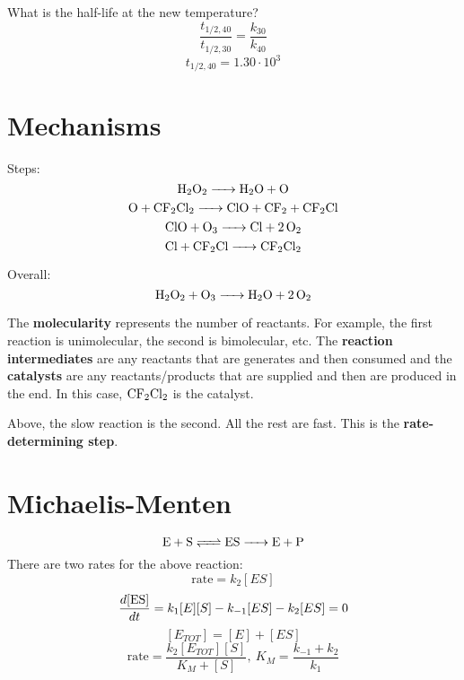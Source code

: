 \documentclass{article}
\begin{document}
What is the half-life at the new temperature?
$$ \frac{ t_{1/2, 40} }{ t_{1/2, 30} } = \frac{k_{30}}{k_{40}} $$
$$ t_{1/2, 40} = 1.30 \cdot 10^{3} $$

\section{Mechanisms}

Steps:
$$ \ce{ H_{2}O_{2} -> H_{2}O + O } $$
$$ \ce{ O + CF_{2}Cl_{2} -> ClO + CF_{2} + CF_{2}Cl } $$
$$ \ce{ ClO + O_{3} -> Cl + 2O_{2} } $$
$$ \ce{ Cl + CF_{2}Cl -> CF_{2}Cl_{2} } $$

Overall:
$$ \ce{ H_{2}O_{2} + O_{3} -> H_{2}O + 2O_{2} } $$

The \textbf{molecularity} represents the number of reactants. For example, the
first reaction is unimolecular, the second is bimolecular, etc. The
\textbf{reaction intermediates} are any reactants that are generates and then
consumed and the \textbf{catalysts} are any reactants/products that are supplied
and then are produced in the end. In this case, $\ce{ CF_{2}Cl_{2} }$ is the
catalyst.

Above, the slow reaction is the second. All the rest are fast. This is the
\textbf{rate-determining step}.

\section{Michaelis-Menten}

$$ \ce{ E + S <=> ES -> E + P } $$
There are two rates for the above reaction:
$$ \mathrm{rate} = k_{2}[ ES ] $$
$$ \frac{ d[\ce{ES}] }{ dt } = k_{1}[E][S] - k_{-1}[ES] - k_{2}[ES] = 0 $$
$$ [E_{TOT}] = [E] + [ES] $$
$$ \mathrm{rate} = \frac{ k_{2}[E_{TOT}][S] }{ K_{M} + [S] },\ K_{M} = \frac{
k_{-1} + k_{2} }{ k_{1} }$$
\end{document}
